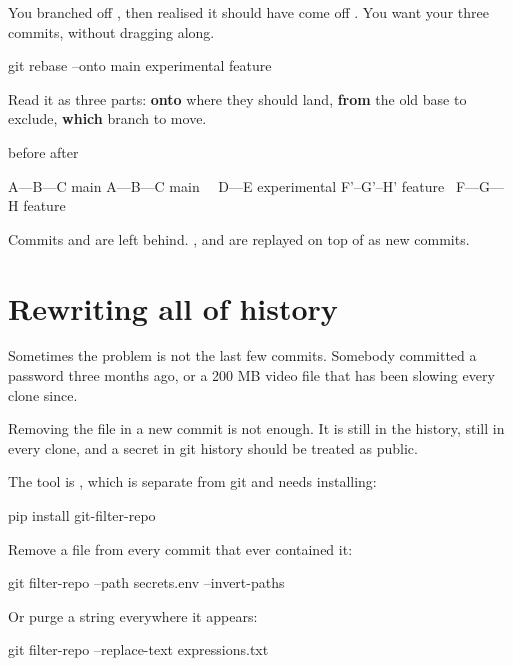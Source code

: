 \documentclass[11pt]{article}
\begin{document}
You branched  off , then realised it should have come
off . You want your three commits, without dragging 
along.

\begin{shell}
git rebase --onto main experimental feature
\end{shell}

Read it as three parts: \textbf{onto} where they should land, \textbf{from} the old
base to exclude, \textbf{which} branch to move.

\begin{terminal}
before                         after

A---B---C  main                A---B---C  main
     \                                  \
      D---E  experimental                F'--G'--H'  feature
           \
            F---G---H  feature
\end{terminal}

Commits  and  are left behind. ,  and  are replayed
on top of  as new commits.

\section{Rewriting all of history}

Sometimes the problem is not the last few commits. Somebody committed a password
three months ago, or a 200 MB video file that has been slowing every clone since.

Removing the file in a new commit is not enough. It is still in the history, still
in every clone, and a secret in git history should be treated as public.

The tool is \co{git-filter-repo}, which is separate from git and needs installing:

\begin{shell}
pip install git-filter-repo
\end{shell}

Remove a file from every commit that ever contained it:

\begin{shell}
git filter-repo --path secrets.env --invert-paths
\end{shell}

Or purge a string everywhere it appears:

\begin{shell}
git filter-repo --replace-text expressions.txt
\end{shell}
\end{document}
